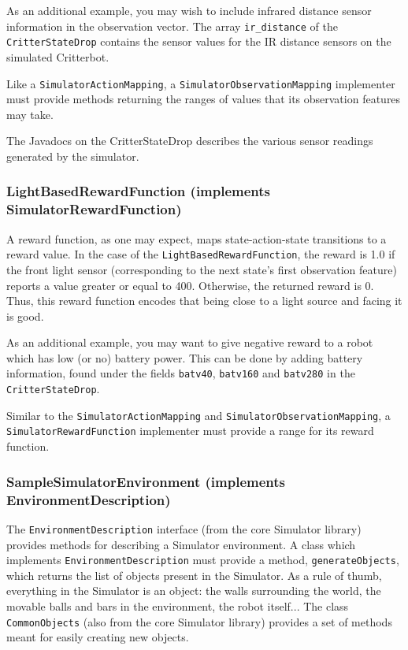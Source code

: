 \documentclass[12pt]{article}
\newcommand{\code}[1]{\texttt{#1}}
\begin{document}
As an additional example, you may wish to include infrared distance sensor
information in the observation vector. The array \verb+ir_distance+ of the
\code{CritterStateDrop} contains the sensor values for the IR distance
sensors on the simulated Critterbot.

Like a \code{SimulatorActionMapping}, a \code{SimulatorObservationMapping}
implementer must provide methods returning the ranges of values that its
observation features may take.

The Javadocs on the CritterStateDrop describes the various sensor readings
generated by the simulator.

\subsubsection{LightBasedRewardFunction (implements SimulatorRewardFunction)}

A reward function, as one may expect, maps state-action-state transitions to
a reward value. In the case of the \code{LightBasedRewardFunction}, the 
reward is 1.0 if the front light sensor (corresponding to the next state's
first observation feature) reports a value greater or equal to 400. Otherwise,
the returned reward is 0. Thus, this reward function encodes that being close
to a light source and facing it is good.

As an additional example, you may want to give negative reward to a robot
which has low (or no) battery power. This can be done by adding battery 
information, found under the fields \verb+batv40+, \verb+batv160+ and
\verb+batv280+ in the \code{CritterStateDrop}.

Similar to the \code{SimulatorActionMapping} and 
\code{SimulatorObservationMapping}, a \code{SimulatorRewardFunction}
implementer must provide a range for its reward function.

\subsubsection{SampleSimulatorEnvironment (implements EnvironmentDescription)} 

The \code{EnvironmentDescription} interface (from the core Simulator library)
provides methods for describing a Simulator environment. A class which 
implements \code{EnvironmentDescription} must provide a method,
\code{generateObjects}, which returns the list of objects present in the
Simulator. As a rule of thumb, everything in the Simulator is an object:
the walls surrounding the world, the movable balls and bars in the
environment, the robot itself... The class \code{CommonObjects} (also from
the core Simulator library) provides a set of methods meant for easily
creating new objects.
\end{document}
